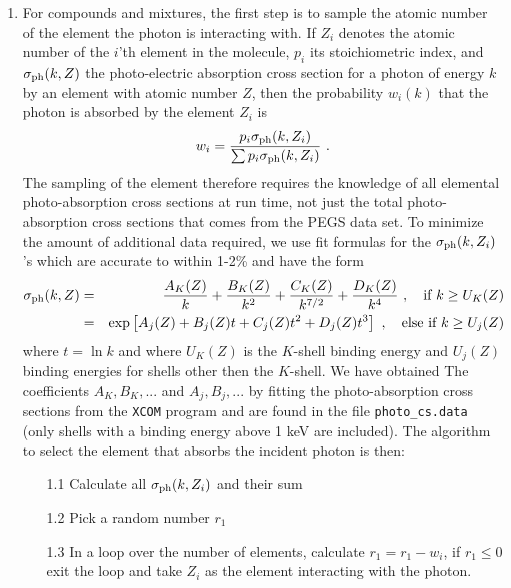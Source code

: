 \begin{enumerate}
\item
For compounds and mixtures, the first step is to sample the 
atomic number of the element the 
photon is interacting with.  
If $Z_i$ denotes the atomic number of the $i$'th element in 
the molecule, $p_i$ its stoichiometric index, and 
$\sigma_{\rm ph}(k,Z)$ the photo-electric absorption 
cross section for a photon of energy $k$ by an element 
with atomic number $Z$, then the probability $w_i(k)$ that 
the photon is absorbed by the element $Z_i$ is
\begin{equation}
w_i = {p_i \sigma_{\rm ph}(k,Z_i) \over \sum p_i \sigma_{\rm ph}(k,Z_i)}~.
\end{equation}
The sampling of the element therefore requires the knowledge of 
all elemental photo-absorption cross sections at run time, not 
just the total photo-absorption cross sections that comes from 
the PEGS data set. To minimize the amount of additional data 
required, we use fit formulas for the $\sigma_{\rm ph}(k,Z_i)$'s 
which are accurate to within 1-2\% and have the form
\begin{eqnarray}
\sigma_{\rm ph}(k,Z) & = & \frac{A_K(Z)}{k} + \frac{B_K(Z)}{k^2} + 
\frac{C_K(Z)}{k^{7/2}} + \frac{D_K(Z)}{k^4}~, \quad \mbox{if}~k \ge U_K(Z)
\\
& = & \exp \left[A_j(Z) + B_j(Z) t + C_j(Z) t^2 + D_j(Z) t^3 
\right]~, \quad \mbox{else if}~k \ge U_j(Z)
\nonumber 
\end{eqnarray}
where $t = \ln k$ and where $U_K(Z)$ is the 
$K$-shell binding energy and $U_j(Z)$ binding 
energies for shells other then the $K$-shell. We have obtained The 
coefficients $A_K, B_K, ...$ and $A_j, B_j, ...$  
by fitting the photo-absorption cross sections from the {\tt XCOM} program 
\cite{BH87} and are found in the file {\tt photo\_cs.data} 
(only shells with a binding energy above 1 keV are included). 
The algorithm to select the element that absorbs the 
incident photon is then:
\begin{itemize}
\item[1.1] Calculate all $\sigma_{\rm ph}(k,Z_i)$ and 
their sum
\item[1.2] Pick a random number $r_1$
\item[1.3] In a loop over the number of elements, calculate 
$r_1 = r_1 - w_i$, if $r_1 \le 0$ exit the loop and take 
$Z_i$ as the element interacting with the photon. 
\end{itemize}

\end{enumerate}
